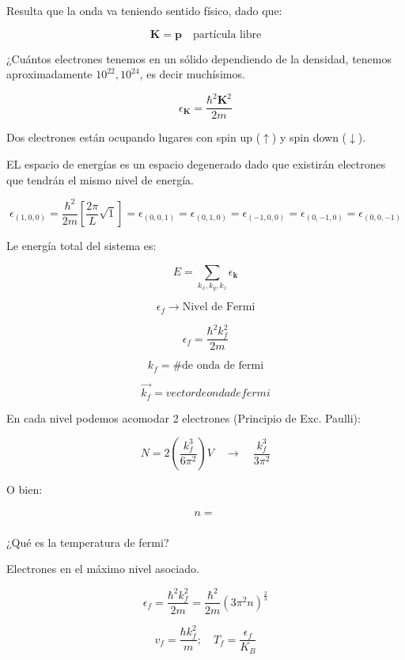 \documentclass{article}
\begin{document}
Resulta que la onda va teniendo sentido físico, dado que:


\[ \boldsymbol{K} = \boldsymbol{p} \quad \text{partícula libre} \]

¿Cuántos electrones tenemos en un sólido dependiendo de la densidad, tenemos aproximadamente $10^{22}, 10^{24}$, es decir muchísimos. 


\[ \epsilon_{\boldsymbol{K}}   = \frac{  \hbar^{2 } \boldsymbol{K}^{2} }{2m}\]


Dos electrones están ocupando lugares con spin up ($\uparrow$) y spin down ($\downarrow$).


EL espacio de energías es un espacio degenerado dado que existirán electrones que tendrán el mismo nivel de energía. 

\[  \epsilon_{(1,0,0)} = \frac{\hbar^{2} }{2m} \left[ \frac{2\pi}{L} \sqrt{1} \right]  = \epsilon_{(0,0,1)} = \epsilon_{(0,1,0)} = \epsilon_{(-1,0,0)} = \epsilon_{(0,-1,0)} = \epsilon_{(0,0,-1)} \]


Le energía total del sistema es:


\[ E = \sum\limits_{k_{x}, k_{y}, k_{z} } \epsilon_{\boldsymbol{k}} \]

\[ \epsilon_{f} \to \text{Nivel de Fermi} \]

\[ \epsilon_{f} = \frac{ \hbar^{2} k_{f}^{2}  }{2m}   \]


\[ k_{f} = \text{\# de onda de fermi}\]

\[ \vec{k_{f}} = vector de onda de fermi \]






En cada nivel podemos acomodar 2 electrones (Principio de Exc. Paulli):


\[ N = 2 \left( \frac{ k_{f}^{3} }{6\pi^{2}}  \right) V \quad \to \quad \frac{ k_{f}^{3} }{3\pi^{2}}   \]


O bien:


\[ n = \frac{   }{}   \]



¿Qué es la temperatura de fermi? 


Electrones en el máximo nivel asociado. 

\[ \epsilon_{f} = \frac{ \hbar^{2} k_{f}^{2}  }{2m} = \frac{ \hbar^{2} }{2m} \left( 3\pi^{2} n  \right)^{\frac{2}{3}}  \]


\[ v_{f} = \frac{ \hbar k^{2}_{f} }{m}; \quad T_{f} = \frac{\epsilon_{f}}{K_{B}} \]
\end{document}
